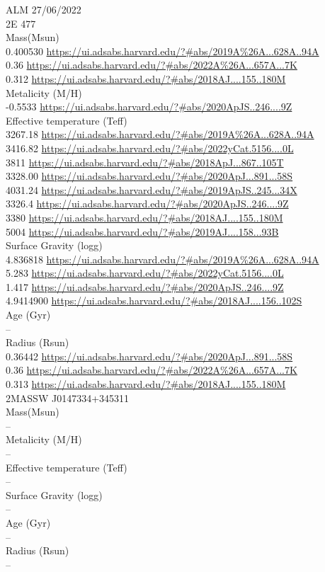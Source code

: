 ALM 27/06/2022\\
2E 477\\
Mass(Msun)\\
0.400530 \url{https://ui.adsabs.harvard.edu/?#abs/2019A%26A...628A..94A}\\
0.36 \url{https://ui.adsabs.harvard.edu/?#abs/2022A%26A...657A...7K}\\
0.312 \url{https://ui.adsabs.harvard.edu/?#abs/2018AJ....155..180M}\\
Metalicity (M/H)\\
-0.5533 \url{https://ui.adsabs.harvard.edu/?#abs/2020ApJS..246....9Z}\\
Effective temperature (Teff) \\
3267.18 \url{https://ui.adsabs.harvard.edu/?#abs/2019A%26A...628A..94A}\\
3416.82 \url{https://ui.adsabs.harvard.edu/?#abs/2022yCat.5156....0L}\\
3811 \url{https://ui.adsabs.harvard.edu/?#abs/2018ApJ...867..105T}\\
3328.00 \url{https://ui.adsabs.harvard.edu/?#abs/2020ApJ...891...58S}\\
4031.24 \url{https://ui.adsabs.harvard.edu/?#abs/2019ApJS..245...34X}\\
3326.4 \url{https://ui.adsabs.harvard.edu/?#abs/2020ApJS..246....9Z}\\
3380 \url{https://ui.adsabs.harvard.edu/?#abs/2018AJ....155..180M}\\
5004 \url{https://ui.adsabs.harvard.edu/?#abs/2019AJ....158...93B}\\
Surface Gravity (logg) \\
4.836818 \url{https://ui.adsabs.harvard.edu/?#abs/2019A%26A...628A..94A}\\
5.283 \url{https://ui.adsabs.harvard.edu/?#abs/2022yCat.5156....0L}\\
1.417 \url{https://ui.adsabs.harvard.edu/?#abs/2020ApJS..246....9Z}\\
4.9414900 \url{https://ui.adsabs.harvard.edu/?#abs/2018AJ....156..102S}\\
Age (Gyr)\\
--\\
Radius (Rsun)\\
0.36442 \url{https://ui.adsabs.harvard.edu/?#abs/2020ApJ...891...58S}\\
0.36 \url{https://ui.adsabs.harvard.edu/?#abs/2022A%26A...657A...7K}\\
0.313 \url{https://ui.adsabs.harvard.edu/?#abs/2018AJ....155..180M}\\
2MASSW J0147334+345311\\
Mass(Msun)\\
--\\
Metalicity (M/H)\\
--\\
Effective temperature (Teff) \\
--\\
Surface Gravity (logg) \\
--\\
Age (Gyr)\\
--\\
Radius (Rsun)\\
--\\

